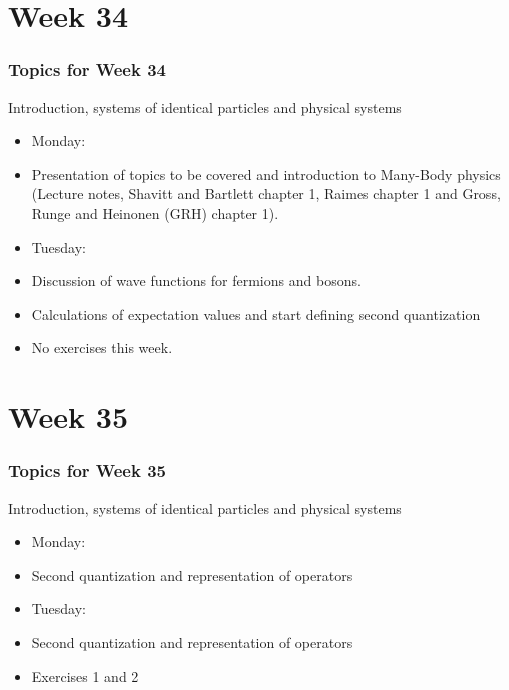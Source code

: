   
\date[UiO]{Fall  2014}
\subject{Quantum mechanics of many-particle systems}






\frame{\titlepage}






\section[Week 34]{Week 34}
\frame
{
  \frametitle{Topics for Week 34}
  \begin{block}{Introduction, systems of identical particles and physical systems}
\begin{itemize}
\item Monday:
\item Presentation of topics to be covered and introduction to Many-Body 
physics (Lecture notes, Shavitt and Bartlett chapter 1, Raimes chapter 1 and Gross, Runge and Heinonen (GRH) chapter 1).
\item Tuesday:
\item Discussion of wave functions for fermions and bosons.
\item Calculations of expectation values and start defining second quantization
\item No exercises this week.
\end{itemize}
  \end{block}
} 

\section[Week 35]{Week 35}

\frame
{
  \frametitle{Topics for Week 35}
  \begin{block}{Introduction, systems of identical particles and physical systems}
\begin{itemize}
\item Monday:
\item Second quantization and representation of operators
\item Tuesday:
\item Second quantization and representation of operators
\item Exercises 1 and 2
\end{itemize}
  \end{block}
} 



